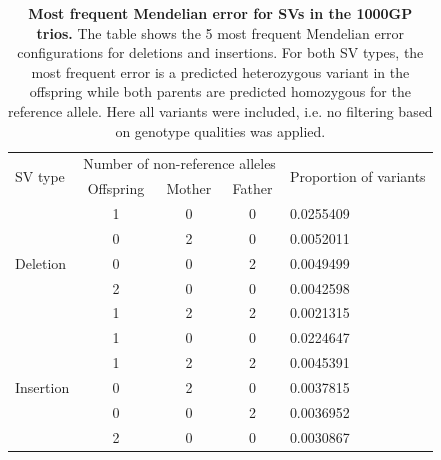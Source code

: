 \documentclass[11pt]{ucscthesis}
\begin{document}
\begin{table}[H]
  \centering
  \begin{tabular}[t]{|l|c|c|c|l|}
    \hline
    \multirow{2}{*}{SV type} & \multicolumn{3}{|l|}{Number of non-reference alleles} & \multirow{2}{*}{Proportion of variants} \\
                             & Offspring                                             & Mother & Father &                       \\
    \hline
    \multirow{5}{*}{Deletion}     & 1                                                     & 0      & 0      & 0.0255409             \\
                             & 0                                                     & 2      & 0      & 0.0052011             \\
                             & 0                                                     & 0      & 2      & 0.0049499             \\
                             & 2                                                     & 0      & 0      & 0.0042598             \\
                             & 1                                                     & 2      & 2      & 0.0021315             \\
    \hline
    \multirow{5}{*}{Insertion}     & 1                                                     & 0      & 0      & 0.0224647             \\
                             & 1                                                     & 2      & 2      & 0.0045391             \\
                             & 0                                                     & 2      & 0      & 0.0037815             \\
                             & 0                                                     & 0      & 2      & 0.0036952             \\
                             & 2                                                     & 0      & 0      & 0.0030867             \\
    \hline
  \end{tabular}
  \caption[Most frequent Mendelian errors for SVs in the 1000GP trios]{{\bf Most frequent Mendelian error for SVs in the 1000GP trios.}
    The table shows the 5 most frequent Mendelian error configurations for deletions and insertions.
    For both SV types, the most frequent error is a predicted heterozygous variant in the offspring while both parents are predicted homozygous for the reference allele.
    Here all variants were included, i.e. no filtering based on genotype qualities was applied.
  }
  \label{tab:sv-mend-error}
\end{table}
\end{document}
